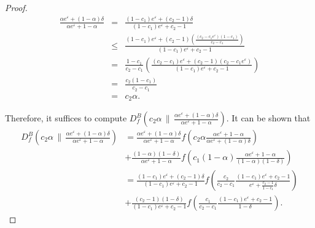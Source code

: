 \documentclass[accepted]{article}
\theoremstyle{plain} %
\theoremstyle{definition}
\theoremstyle{remark}
\newcommand{\eps}{\varepsilon}
\newcommand{\bQ}{\mathbf{Q}}
\begin{document}
\begin{proof}
\begin{eqnarray*}
    \frac{\alpha e^\eps+(1-\alpha)\delta}{\alpha e^\eps+1-\alpha}&=&\frac{(1-c_1) e^\eps+(c_2-1)\delta}{(1-c_1) e^\eps+c_2-1}\\
    &\leq&\frac{(1-c_1) e^\eps+(c_2-1)\left(\frac{(c_2-c_1e^\eps)(1-c_1)}{c_2-c_1}\right)}{(1-c_1) e^\eps+c_2-1}\\
    &=&\frac{1-c_1}{c_2-c_1}\left(\frac{(c_2-c_1)e^\eps+(c_2-1)(c_2-c_1e^\eps)}{(1-c_1)e^\eps+c_2-1}\right)\\
    &=&\frac{c_2(1-c_1)}{c_2-c_1}\\
    &=&c_2\alpha.
\end{eqnarray*}

Therefore, it suffices to compute $D_f^B \left( c_2 \alpha \, \| \, \frac{\alpha e^\varepsilon + (1-\alpha)\delta}{\alpha e^\varepsilon + 1-\alpha} \right)$. It can be shown that
\begin{align*}
  D_f^B\left(c_2 \alpha \,\Big\|\, \frac{\alpha e^\varepsilon + (1-\alpha)\delta}{\alpha e^\varepsilon + 1-\alpha}\right) &
  = \frac{\alpha e^\varepsilon + (1-\alpha)\delta}{\alpha e^\varepsilon + 1-\alpha}
f\left( c_2 \alpha \frac{\alpha e^\varepsilon + 1-\alpha}{\alpha e^\varepsilon + (1-\alpha)\delta} \right) \\
& + \frac{(1-\alpha)(1-\delta)}{\alpha e^\varepsilon + 1-\alpha}
f\left( c_1 (1-\alpha) \frac{\alpha e^\varepsilon + 1-\alpha}{(1-\alpha)(1-\delta)} \right) \\
&= \frac{(1-c_1)e^\varepsilon + (c_2-1)\delta}{(1-c_1)e^\varepsilon + c_2-1}
f\left( \frac{c_2}{c_2-c_1} \frac{(1-c_1)e^\varepsilon + c_2-1}{e^\varepsilon + \frac{c_2-1}{1-c_1}\delta} \right) \\
&+ \frac{(c_2-1)(1-\delta)}{(1-c_1)e^\varepsilon + c_2-1}
f\left( \frac{c_1}{c_2-c_1} \frac{(1-c_1)e^\varepsilon + c_2-1}{1-\delta} \right).
\end{align*}




\end{proof}
\end{document}
